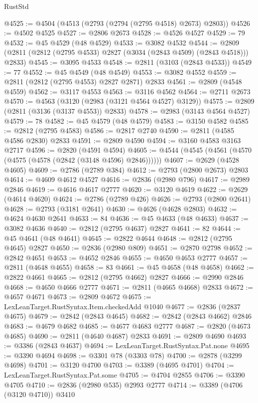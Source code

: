 \begin{lexlean}{RustStd}
\begin{coremodule}
@4525 := @4504 (@4513 (@2793 (@2794 (@2795 @4518) @2673) @2803))
@4526 := @4502 @4525
@4527 := @2806 @2673
@4528 := @4526 @4527
@4529 := 79
@4532 := @45 @4529 (@48 @4529)
@4533 := @3082 @4532
@4544 := @2809 (@2811 (@2812 (@2795 @4533) @2827 (@3034 (@2843 @4509) (@2843 @4518))) @2833)
@4545 := @3095 @4533
@4548 := @2811 (@3103 (@2843 @4533))
@4549 := 77
@4552 := @45 @4549 (@48 @4549)
@4553 := @3082 @4552
@4559 := @2811 (@2812 (@2795 @4553) @2827 @2871) @2833
@4561 := @2809 (@4548 @4559)
@4562 := @3117 @4553
@4563 := @3116 @4562
@4564 := @2711 @2673
@4570 := @4563 (@3120 (@2983 (@3121 @4564 @4527) @3129))
@4575 := @2809 (@2811 (@3136 (@3137 @4553)) @2833)
@4578 := @2983 (@3143 @4564 @4527)
@4579 := 78
@4582 := @45 @4579 (@48 @4579)
@4583 := @3150 @4582
@4585 := @2812 (@2795 @4583)
@4586 := @2817 @2740
@4590 := @2811 (@4585 @4586 @2830) @2833
@4591 := @2809 @4590
@4594 := @3160 @4583 @3163 @2717
@4596 := @2820 (@4591 @4594)
@4605 := @4544 (@4545 (@4561 (@4570 (@4575 (@4578 (@2842 (@3148 @4596) @2846))))))
@4607 := @2629 (@4528 @4605)
@4609 := @2786 (@2789 @384)
@4612 := @2793 (@2800 @2673) @2803
@4614 := @4609 @4612 @4527
@4616 := @2836 (@2980 @796)
@4617 := @2989 @2846
@4619 := @4616 @4617 @2777
@4620 := @3120 @4619
@4622 := @2629 (@4614 @4620)
@4624 := @2786 (@2789 @426)
@4626 := @2793 (@2800 @2641)
@4628 := @2793 (@3181 @2641)
@4630 := @4626 (@4628 @2803)
@4632 := @4624 @4630 @2641
@4633 := 84
@4636 := @45 @4633 (@48 @4633)
@4637 := @3082 @4636
@4640 := @2812 (@2795 @4637) @2827
@4641 := 82
@4644 := @45 @4641 (@48 @4641)
@4645 := @2822 @4644
@4648 := @2812 (@2795 @4645) @2827
@4650 := @2836 (@2980 @809)
@4651 := @2870 @2798
@4652 := @2842 @4651
@4653 := @4652 @2846
@4655 := @4650 @4653 @2777
@4657 := @2811 (@4648 @4655)
@4658 := 83
@4661 := @45 @4658 (@48 @4658)
@4662 := @2822 @4661
@4665 := @2812 (@2795 @4662) @2827
@4666 := @2990 @2846
@4668 := @4650 @4666 @2777
@4671 := @2811 (@4665 @4668) @2833
@4672 := @4657 @4671
@4673 := @2809 @4672
@4675 := LexLeanTarget.RustSyntax.Item.checkedAdd @1040
@4677 := @2836 (@2837 @4675)
@4679 := @2842 (@2843 @4645)
@4682 := @2842 (@2843 @4662) @2846
@4683 := @4679 @4682
@4685 := @4677 @4683 @2777
@4687 := @2820 (@4673 @4685)
@4690 := @2811 (@4640 @4687) @2833
@4691 := @2809 @4690
@4693 := @3386 (@2843 @4637)
@4694 := LexLeanTarget.RustSyntax.Pat.none
@4695 := @3390 @4694
@4698 := @3301 @78 (@3303 @78)
@4700 := @2878 (@3299 @4698)
@4701 := @3120 @4700
@4703 := @3389 (@4695 @4701)
@4704 := LexLeanTarget.RustSyntax.Pat.some
@4705 := @4704 @2855
@4706 := @3390 @4705
@4710 := @2836 (@2980 @535) @2993 @2777
@4714 := @3389 (@4706 (@3120 @4710)) @3410

\end{coremodule}
\end{lexlean}
